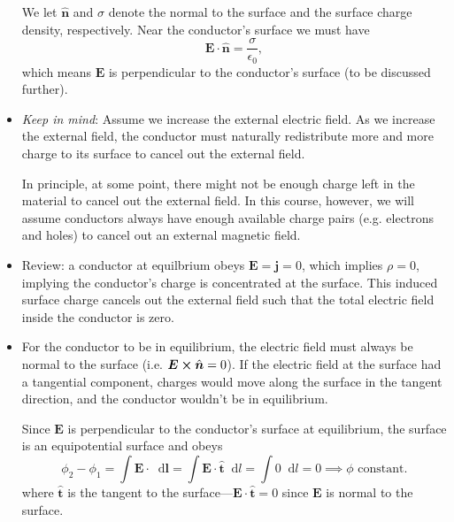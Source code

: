 \documentclass[11pt, a4paper]{article}
\newcommand{\diff}{\mathop{}\!\mathrm{d}} %
\renewcommand{\vec}[1]{\bm{#1}} %
\newcommand{\uvec}[1]{\hat{\vec{#1}}} %
\newcommand{\E}{\vec{E}} %
\newcommand{\ee}{\epsilon_{0}}  %
\renewcommand{\j}{\vec{j}}  %
\begin{document}
\begin{itemize}
    We let $ \uvec{n} $ and $ \sigma $ denote the normal to the surface and the surface charge density, respectively. Near the conductor's surface we must have 
	\begin{equation*}
		\E \cdot \uvec{n} = \frac{\sigma}{\ee},
	\end{equation*}
	which means $ \E $ is perpendicular to the conductor's surface (to be discussed further).
	
	\item \textit{Keep in mind}: Assume we increase the external electric field. As we increase the external field, the conductor must naturally redistribute more and more charge to its surface to cancel out the external field. 
	
	In principle, at some point, there might not be enough charge left in the material to cancel out the external field. In this course, however, we will assume conductors always have enough available charge pairs (e.g. electrons and holes) to cancel out an external magnetic field. 
	
    \item Review: a conductor at equilbrium obeys $ \E = \j = 0 $, which implies $ \rho = 0 $, implying the conductor's charge is concentrated at the surface. This induced surface charge cancels out the external field such that the total electric field inside the conductor is zero. 
	
	\item For the conductor to be in equilibrium, the electric field must always be normal to the surface (i.e. $ \E \cross \uvec{n} = 0 $). If the electric field at the surface had a tangential component, charges would move along the surface in the tangent direction, and the conductor wouldn't be in equilibrium. 
	
	Since $ \E $ is perpendicular to the conductor's surface at equilibrium, the surface is an equipotential surface and obeys
	\begin{equation*}
		\phi_{2} - \phi_{1} = \int \E \cdot \diff \vec{l} = \int \E \cdot \uvec{t} \diff l = \int 0 \diff l = 0 \implies \phi \text{ constant}.
	\end{equation*}
	where $ \uvec{t} $ is the tangent to the surface---$ \E \cdot \uvec{t} = 0$ since $ \E $ is normal to the surface. 

\end{itemize}
\end{document}
